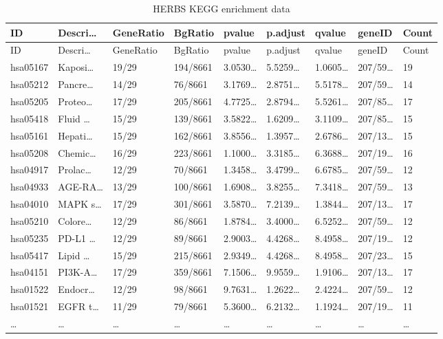 \documentclass[
]{article}
\begin{document}
\begin{longtable}[]{@{}lllllllll@{}}
\caption{\label{tab:HERBS-KEGG-enrichment-data}HERBS KEGG enrichment data}\tabularnewline
\toprule
ID & Descri\ldots{} & GeneRatio & BgRatio & pvalue & p.adjust & qvalue & geneID & Count\tabularnewline
\midrule
\endfirsthead
\toprule
ID & Descri\ldots{} & GeneRatio & BgRatio & pvalue & p.adjust & qvalue & geneID & Count\tabularnewline
\midrule
\endhead
hsa05167 & Kaposi\ldots{} & 19/29 & 194/8661 & 3.0530\ldots{} & 5.5259\ldots{} & 1.0605\ldots{} & 207/59\ldots{} & 19\tabularnewline
hsa05212 & Pancre\ldots{} & 14/29 & 76/8661 & 3.1769\ldots{} & 2.8751\ldots{} & 5.5178\ldots{} & 207/59\ldots{} & 14\tabularnewline
hsa05205 & Proteo\ldots{} & 17/29 & 205/8661 & 4.7725\ldots{} & 2.8794\ldots{} & 5.5261\ldots{} & 207/85\ldots{} & 17\tabularnewline
hsa05418 & Fluid \ldots{} & 15/29 & 139/8661 & 3.5822\ldots{} & 1.6209\ldots{} & 3.1109\ldots{} & 207/85\ldots{} & 15\tabularnewline
hsa05161 & Hepati\ldots{} & 15/29 & 162/8661 & 3.8556\ldots{} & 1.3957\ldots{} & 2.6786\ldots{} & 207/13\ldots{} & 15\tabularnewline
hsa05208 & Chemic\ldots{} & 16/29 & 223/8661 & 1.1000\ldots{} & 3.3185\ldots{} & 6.3688\ldots{} & 207/19\ldots{} & 16\tabularnewline
hsa04917 & Prolac\ldots{} & 12/29 & 70/8661 & 1.3458\ldots{} & 3.4799\ldots{} & 6.6785\ldots{} & 207/59\ldots{} & 12\tabularnewline
hsa04933 & AGE-RA\ldots{} & 13/29 & 100/8661 & 1.6908\ldots{} & 3.8255\ldots{} & 7.3418\ldots{} & 207/59\ldots{} & 13\tabularnewline
hsa04010 & MAPK s\ldots{} & 17/29 & 301/8661 & 3.5870\ldots{} & 7.2139\ldots{} & 1.3844\ldots{} & 207/13\ldots{} & 17\tabularnewline
hsa05210 & Colore\ldots{} & 12/29 & 86/8661 & 1.8784\ldots{} & 3.4000\ldots{} & 6.5252\ldots{} & 207/59\ldots{} & 12\tabularnewline
hsa05235 & PD-L1 \ldots{} & 12/29 & 89/8661 & 2.9003\ldots{} & 4.4268\ldots{} & 8.4958\ldots{} & 207/19\ldots{} & 12\tabularnewline
hsa05417 & Lipid \ldots{} & 15/29 & 215/8661 & 2.9349\ldots{} & 4.4268\ldots{} & 8.4958\ldots{} & 207/23\ldots{} & 15\tabularnewline
hsa04151 & PI3K-A\ldots{} & 17/29 & 359/8661 & 7.1506\ldots{} & 9.9559\ldots{} & 1.9106\ldots{} & 207/13\ldots{} & 17\tabularnewline
hsa01522 & Endocr\ldots{} & 12/29 & 98/8661 & 9.7631\ldots{} & 1.2622\ldots{} & 2.4224\ldots{} & 207/59\ldots{} & 12\tabularnewline
hsa01521 & EGFR t\ldots{} & 11/29 & 79/8661 & 5.3600\ldots{} & 6.2132\ldots{} & 1.1924\ldots{} & 207/19\ldots{} & 11\tabularnewline
\ldots{} & \ldots{} & \ldots{} & \ldots{} & \ldots{} & \ldots{} & \ldots{} & \ldots{} & \ldots{}\tabularnewline
\bottomrule
\end{longtable}
\end{document}
